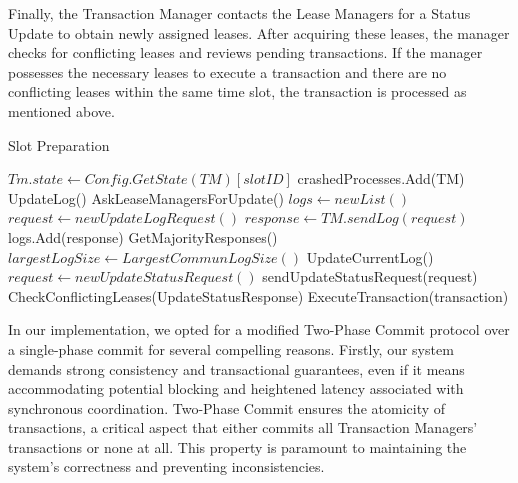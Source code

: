 \documentclass[times, 10pt,twocolumn]{article}
\begin{document}
Finally, the Transaction Manager contacts the Lease Managers for 
a Status Update to obtain newly assigned leases. After acquiring 
these leases, the manager checks for conflicting leases and 
reviews pending transactions. If the manager possesses the necessary 
leases to execute a transaction and there are no conflicting leases 
within the same time slot, the transaction is processed as mentioned 
above.

\begin{algorithm}
    \caption{Slot Preparation}
    \begin{algorithmic}[1]
            \State $Tm.state \gets Config.GetState(TM)[slotID]$
                    \State crashedProcesses.Add(TM)
                \EndIf
            \EndFor
            \State UpdateLog()
            \State AskLeaseManagersForUpdate()
        \EndFunction
            \State $logs \gets new List()$
            \State $request \gets new UpdateLogRequest()$
                \State $response \gets TM.sendLog(request)$
                \State logs.Add(response)
            \EndFor
            \State GetMajorityResponses()
            \State $largestLogSize \gets LargestCommunLogSize()$
                \State UpdateCurrentLog()
            \EndIf
        \EndFunction
            \State $request \gets new UpdateStatusRequest()$
                \State sendUpdateStatusRequest(request)
            \EndFor
            \State CheckConflictingLeases(UpdateStatusResponse)
                    \State ExecuteTransaction(transaction)
                \EndIf
            \EndFor
        \EndFunction
    \end{algorithmic}
\end{algorithm}

In our implementation, we opted for a modified Two-Phase Commit protocol over a single-phase commit for several compelling reasons. Firstly, our system 
demands strong consistency and transactional guarantees, even if 
it means accommodating potential blocking and heightened latency 
associated with synchronous coordination. Two-Phase Commit ensures 
the atomicity of transactions, a critical aspect that either 
commits all Transaction Managers' transactions or none at all. 
This property is paramount to maintaining the system's correctness 
and preventing inconsistencies.
\end{document}
